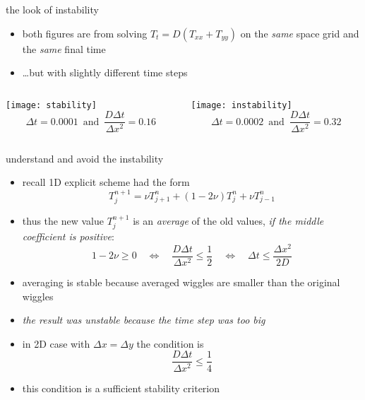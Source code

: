 \begin{frame}{the look of instability}

\begin{itemize}
\item both figures are from solving $T_t = D(T_{xx} + T_{yy})$ on the \emph{same} space grid and the \emph{same} final time
\item \dots but with slightly different time steps
\end{itemize}

\medskip
\begin{columns}
\begin{column}{0.5\textwidth}
\begin{center}
\texttt{[image: stability]}
\medskip
\small
  $$\Delta t=0.0001 \, \text{ and } \, \frac{D\Delta t}{\Delta x^2}= 0.16$$
\end{center}
\end{column}
\begin{column}{0.5\textwidth}
\begin{center}
\texttt{[image: instability]}
\small
\smallskip
  $$\Delta t=0.0002 \, \text{ and } \, \frac{D\Delta t}{\Delta x^2}= 0.32$$
\end{center}
\end{column}
\end{columns}
\end{frame}


\begin{frame}{understand and avoid the instability}
\label{slide:maxprinc}

\begin{itemize}
\item recall 1D explicit scheme had the form 
	$$T_j^{n+1} = \nu T_{j+1}^n + (1 - 2 \nu) T_j^n + \nu T_{j-1}^n$$
\item thus the new value $T_j^{n+1}$ is an \emph{average} of the old values, \emph{if the middle coefficient is positive}:
	$$1 - 2 \nu \ge 0 \quad \iff \quad  \frac{D\Delta t}{\Delta x^2} \le \frac{1}{2} \quad \iff \quad \Delta t \le \frac{\Delta x^2}{2 D}$$
\item averaging is stable because averaged wiggles are smaller than the original wiggles
\item \emph{the result was unstable because the time step was too big}

\item in 2D case with $\Delta x = \Delta y$ the condition is
	$$\frac{D\Delta t}{\Delta x^2} \le \frac{1}{4}$$
\vspace{-3mm}
\item this condition is a sufficient \alert{stability criterion}
\end{itemize}
\end{frame}


